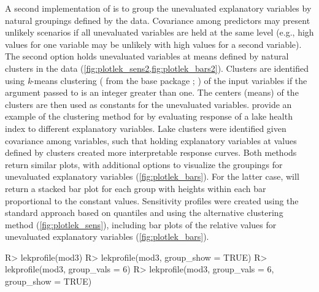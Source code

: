 \documentclass[article]{jss}
\begin{document}
A second implementation of  is to group the
unevaluated explanatory variables by natural groupings defined by the
data. Covariance among predictors may present unlikely scenarios if
all unevaluated variables are held at the same level (e.g., high
values for one variable may be unlikely with high values for a second
variable). The second option holds unevaluated variables at means
defined by natural clusters in the data
(\cref{fig:plotlek_sens2,fig:plotlek_bars2}). Clusters are identified
using {\it k}-means clustering ( from the base package
; \citealt{Hartigan79}) of the input variables if the
argument passed to  is an integer greater than
one. The centers (means) of the clusters are then used as constants
for the unevaluated variables.  \citet{Beck14a} provide an example of
the clustering method for  by evaluating response of
a lake health index to different explanatory variables.  Lake clusters
were identified given covariance among variables, such that holding
explanatory variables at values defined by clusters created more
interpretable response curves.  Both methods return similar plots,
with additional options to visualize the groupings for unevaluated
explanatory variables (\cref{fig:plotlek_bars}).  For the latter case,
 will return a stacked bar plot for each
group with heights within each bar proportional to the constant
values.  Sensitivity profiles were created using the standard approach
based on quantiles and using the alternative clustering method
(\cref{fig:plotlek_sens}), including bar plots of the relative values
for unevaluated explanatory variables (\cref{fig:plotlek_bars}).
%
\begin{Schunk}
\begin{Sinput}
R> lekprofile(mod3)
R> lekprofile(mod3, group_show = TRUE)
R> lekprofile(mod3, group_vals = 6)
R> lekprofile(mod3, group_vals = 6, group_show = TRUE)
\end{Sinput}
\end{Schunk}
%
\end{document}
